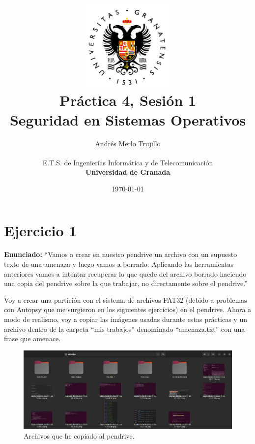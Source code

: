 \documentclass{article}
\title{
\includegraphics[width=1.75in]{imagenes/UGR-Logo.png} \\
\vspace*{1in}
\textbf{Práctica 4, Sesión 1} \\
Seguridad en Sistemas Operativos \\
\vspace*{0.5in}}
\author{Andrés Merlo Trujillo \\
\vspace*{0.5in} \\
E.T.S. de Ingenierías Informática y de Telecomunicación \\
\textbf{Universidad de Granada}} \date{\today}
\begin{document}
\begin{titlingpage}
\maketitle
\end{titlingpage}

\newpage

\tableofcontents

\newpage

\pagestyle{fancy}

\section{Ejercicio 1}

\textbf{Enunciado:} ``Vamos a crear en nuestro pendrive un archivo con un supuesto texto de una amenaza y luego vamos a borrarlo. Aplicando las herramientas anteriores vamos a intentar recuperar lo que quede del archivo borrado haciendo una copia del pendrive sobre la que trabajar, no directamente
sobre el pendrive.''

\bigskip

Voy a crear una partición con el sistema de archivos FAT32 (debido a problemas con Autopsy que me surgieron en los siguientes ejercicios) en el pendrive. Ahora a modo de realismo, voy a copiar las imágenes usadas durante estas prácticas y un archivo dentro de la carpeta ``mis trabajos'' denominado ``amenaza.txt'' con una frase que amenace.

\begin{figure}[H]
    \centering
    \includegraphics[width=\textwidth]{imagenes/Captura desde 2022-12-02 17-34-22.png}
    \caption{Archivos que he copiado al pendrive.}
\end{figure}
\end{document}
